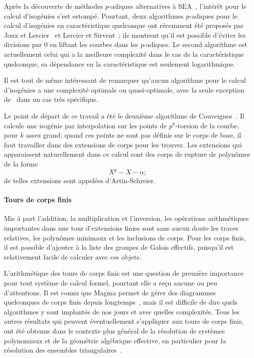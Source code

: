 Après la découverte de méthodes $p$-adiques alternatives à
SEA~\cite{satoh00,fouquet+gaudry+harley00}, l'intérêt pour le calcul
d'isogénies s'est estompé. Pourtant, deux algorithmes $p$-adiques pour
le calcul d'isogénies en caractéristique quelconque ont récemment été
proposés par Joux et Lercier~\cite{joux+lercier06} et Lercier et
Sirvent~\cite{lercier+sirvent08}; ils montrent qu'il est possible
d'éviter les divisions par $0$ en liftant les courbes dans les
$p$-adiques. Le second algorithme est actuellement celui qui a la
meilleure complexité dans le cas de la caractéristique quelconque, sa
dépendance en la caractéristique est seulement logarithmique.

Il est tout de même intéressant de remarquer qu'aucun algorithme pour
le calcul d'isogénies a une complexité optimale ou quasi-optimale,
avec la seule exception de~\cite{bostan+morain+salvy+schost08} dans un
cas très spécifique.

Le point de départ de ce travail a été le deuxième algorithme de
Couveignes~\cite{couveignes96}. Il calcule une isogénie par
interpolation sur les points de $p^k$-torsion de la courbe, pour $k$
assez grand; quand ces points ne sont pas définis sur le corps de
base, il faut travailler dans des extensions de corps pour les
trouver. Les extensions qui apparaissent naturellement dans ce calcul sont des corps de rupture de polynômes de la forme
\[X^p-X-\alpha\text{;}\] de telles extensions sont appelées
d'Artin-Schreier.

\paragraph*{Tours de corps finis}
\label{sec:tours-de-corps}
Mis à part l'addition, la multiplication et l'inversion, les
opérations arithmétiques importantes dans une tour d'extensions finies
sont sans aucun doute les traces relatives, les polynômes minimaux et
les inclusions de corps. Pour les corps finis, il est possible
d'ajouter à la liste des groupes de Galois effectifs, puisqu'il est
relativement facile de calculer avec ces objets.

L'arithmétique des tours de corps finis est une question de première
importance pour tout système de calcul formel, pourtant elle a reçu
aucune ou peu d'attentions. Il est connu que Magma permet de gérer des
diagrammes quelconques de corps finis depuis
longtemps~\cite{bosma+cannon+steel97}, mais il est difficile de dire
quels algorithmes y sont implantés de nos jours et avec quelles
complexités. Tous les autres résultats qui peuvent éventuellement
s'appliquer aux tours de corps finis, ont été obtenus dans le contexte
plus général de la résolution de systèmes polynomiaux et de la
géométrie algébrique effective, en particulier pour la résolution des
ensembles
triangulaires~\cite{diaz+gonzalez01,giusti+lecerf+salvy01,bostan+salvy+schost03,pascal+schost06,li+moreno+schost07,dahan+jin+moreno+schost08,boulier+lemaire+moreno01,FGLM,rouiller99,alonso+becker+roy+wormann}.

